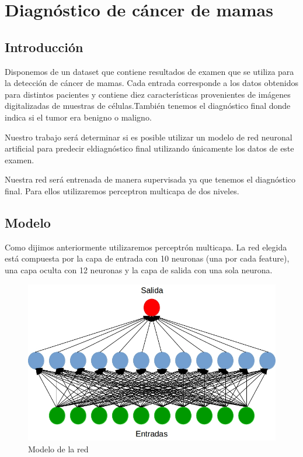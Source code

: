 \section{Diagnóstico de cáncer de mamas}


\subsection{Introducción}

Disponemos de un dataset que contiene resultados de examen que se utiliza para la detección de cáncer de mamas. Cada entrada 
corresponde a los datos obtenidos para distintos pacientes y contiene diez características provenientes de imágenes digitalizadas 
de muestras de células.También tenemos el diagnóstico final donde indica si el tumor era benigno o maligno. 

Nuestro trabajo será determinar si es posible utilizar un modelo de red neuronal artificial para predecir eldiagnóstico final utilizando
únicamente los datos de este examen.

Nuestra red será entrenada de manera supervisada ya que tenemos el diagnóstico final. Para ellos utilizaremos perceptron multicapa de 
dos niveles.


\subsection{Modelo}
Como dijimos anteriormente utilizaremos perceptrón multicapa. La red elegida está compuesta por la capa de entrada con 10 neuronas 
(una por cada feature), una capa oculta con 12 neuronas y la capa de salida con una sola neurona. 

\begin{figure}[ht!]
	\centering
	\includegraphics[width=0.9\linewidth]{fig/parte1-modelo.jpg}
	\caption{Modelo de la red}
\end{figure}

